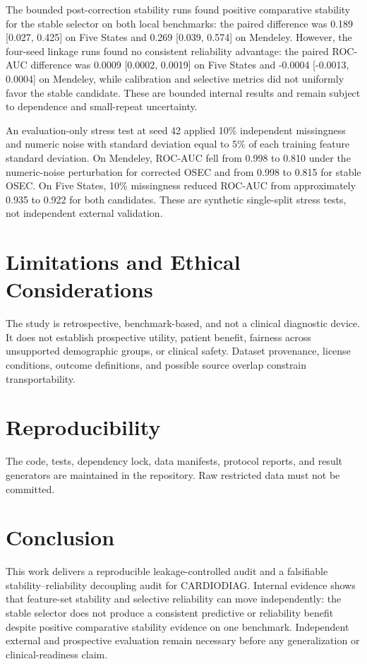 \documentclass[journal]{IEEEtran}
\begin{document}
The bounded post-correction stability runs found positive comparative stability
for the stable selector on both local benchmarks: the paired difference was
0.189 [0.027, 0.425] on Five States and 0.269 [0.039, 0.574] on Mendeley.
However, the four-seed linkage runs found no consistent reliability advantage:
the paired ROC-AUC difference was 0.0009 [0.0002, 0.0019] on Five States and
-0.0004 [-0.0013, 0.0004] on Mendeley, while calibration and selective metrics
did not uniformly favor the stable candidate. These are bounded internal
results and remain subject to dependence and small-repeat uncertainty.

An evaluation-only stress test at seed 42 applied 10\% independent missingness
and numeric noise with standard deviation equal to 5\% of each training feature
standard deviation. On Mendeley, ROC-AUC fell from 0.998 to 0.810 under the
numeric-noise perturbation for corrected OSEC and from 0.998 to 0.815 for stable
OSEC. On Five States, 10\% missingness reduced ROC-AUC from approximately 0.935
to 0.922 for both candidates. These are synthetic single-split stress tests,
not independent external validation.

\section{Limitations and Ethical Considerations}
The study is retrospective, benchmark-based, and not a clinical diagnostic
device. It does not establish prospective utility, patient benefit, fairness
across unsupported demographic groups, or clinical safety. Dataset provenance,
license conditions, outcome definitions, and possible source overlap constrain
transportability.

\section{Reproducibility}
The code, tests, dependency lock, data manifests, protocol reports, and result
generators are maintained in the repository. Raw restricted data must not be
committed.

\section{Conclusion}
This work delivers a reproducible leakage-controlled audit and a falsifiable
stability--reliability decoupling audit for CARDIODIAG. Internal evidence shows
that feature-set stability and selective reliability can move independently:
the stable selector does not produce a consistent predictive or reliability
benefit despite positive comparative stability evidence on one benchmark.
Independent external and prospective evaluation remain necessary before any
generalization or clinical-readiness claim.



\end{document}
